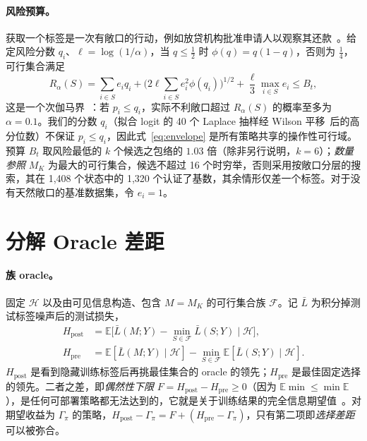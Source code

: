 \documentclass[runningheads]{llncs}
\begin{document}
\paragraph{风险预算。}获取一个标签是一次有敞口的行动，例如放贷机构批准申请人以观察其还款~\cite{lakkaraju2017selective,wei2021selective}。给定风险分数 $q_i$、$\ell=\log(1/\alpha)$，当 $q\le\frac12$ 时 $\phi(q)=q(1-q)$，否则为 $\frac14$，可行集合满足
\begin{equation}
 R_\alpha(S)=\sum_{i\in S}e_iq_i+\Big(2\ell\sum_{i\in S}e_i^2\phi(q_i)\Big)^{1/2}+\frac{\ell}{3}\max_{i\in S}e_i\le B_t,
 \label{eq:envelope}
\end{equation}
这是一个次伽马界~\cite{boucheron2013concentration}：若 $p_i\le q_i$，实际不利敞口超过 $R_\alpha(S)$ 的概率至多为 $\alpha=0.1$。我们的分数 $q_i$（拟合 logit 的 40 个 Laplace 抽样经 Wilson 平移~\cite{wilson1927probable}后的高分位数）不保证 $p_i\le q_i$，因此式~\eqref{eq:envelope} 是所有策略共享的操作性可行域。预算 $B_t$ 取风险最低的 $k$ 个候选之包络的 $1.03$ 倍（除非另行说明，$k=6$）；\emph{数量参照} $M_K$ 为最大的可行集合，候选不超过 16 个时穷举，否则采用按敞口分层的搜索，其在 1{,}408 个状态中的 1{,}320 个认证了基数，其余情形仅差一个标签。对于没有天然敞口的基准数据集，令 $e_i=1$。

\section{分解 Oracle 差距}
\label{sec:protocol}
\paragraph{族 oracle。}固定 $\mathcal H$ 以及由可见信息构造、包含 $M=M_K$ 的可行集合族 $\mathcal F$。记 $\bar L$ 为积分掉测试标签噪声后的测试损失，
\begin{align}
 H_{\mathrm{post}}&=\mathbb E\big[\bar L(M;Y)-\min_{S\in\mathcal F}\bar L(S;Y)\mid\mathcal H\big],\\
 H_{\mathrm{pre}}&=\mathbb E[\bar L(M;Y)\mid\mathcal H]-\min_{S\in\mathcal F}\mathbb E[\bar L(S;Y)\mid\mathcal H].
\end{align}
$H_{\mathrm{post}}$ 是看到隐藏训练标签后再挑最佳集合的 oracle 的领先；$H_{\mathrm{pre}}$ 是最佳固定选择的领先。二者之差，即\emph{偶然性下限} $F=H_{\mathrm{post}}-H_{\mathrm{pre}}\ge0$（因为 $\mathbb E\min\le\min\mathbb E$），是任何可部署策略都无法达到的，它就是关于训练结果的完全信息期望值~\cite{howard1966information}。对期望收益为 $\Gamma_\pi$ 的策略，$H_{\mathrm{post}}-\Gamma_\pi=F+(H_{\mathrm{pre}}-\Gamma_\pi)$，只有第二项即\emph{选择差距}可以被弥合。
\end{document}
